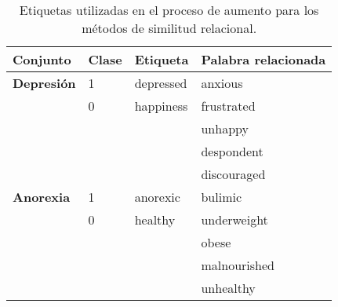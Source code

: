 
\begin{table}[!hbt]
\caption{Etiquetas utilizadas en el proceso de aumento para los métodos de similitud relacional.} \label{table:etiquetas}
\begin{center}

\begin{tabular}{llll}
\hline
\rowcolor[HTML]{C0C0C0} 
Conjunto           & Clase & Etiqueta  & Palabra relacionada \\ \hline
\textbf{Depresión} & 1     & depressed & anxious           \\ \hline
                   & 0     & happiness & frustrated        \\ \hline
                   &       &           & unhappy           \\ \hline
                   &       &           & despondent        \\ \hline
                   &       &           & discouraged       \\ \hline
\textbf{Anorexia}  & 1     & anorexic  & bulimic           \\ \hline
                   & 0     & healthy   & underweight       \\ \hline
                   &       &           & obese             \\ \hline
                   &       &           & malnourished      \\ \hline
                   &       &           & unhealthy         \\ \hline
\end{tabular}

\end{center}
\end{table}
